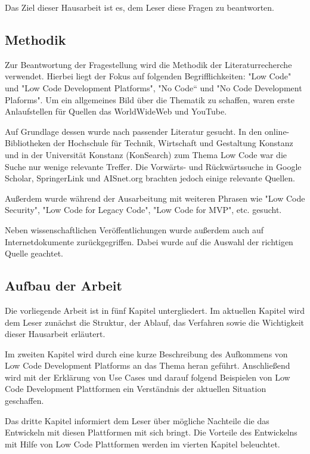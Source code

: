 \documentclass[12pt]{article} %
\begin{document}
	Das Ziel dieser Hausarbeit ist es, dem Leser diese Fragen zu beantworten. 
	
	\subsection{Methodik}
	Zur Beantwortung der Fragestellung wird die Methodik der Literaturrecherche verwendet. Hierbei liegt der Fokus auf folgenden Begrifflichkeiten:
	"Low Code" und "Low Code Development Platforms", "No Code“ und "No Code Development Plaforms". 
	Um ein allgemeines Bild über die Thematik zu schaffen, waren erste Anlaufstellen für Quellen das WorldWideWeb und YouTube. \newline
	
	Auf Grundlage dessen wurde nach passender Literatur gesucht. In den online-Bibliotheken der Hochschule für Technik, Wirtschaft und Gestaltung Konstanz und in der Universität Konstanz (KonSearch) zum Thema Low Code war die Suche nur wenige relevante Treffer. Die Vorwärts- und Rückwärtssuche in Google Scholar, SpringerLink und AISnet.org brachten jedoch einige relevante Quellen. 
	
	Außerdem wurde während der Ausarbeitung mit weiteren Phrasen wie "Low Code Security", "Low Code for Legacy Code", "Low Code for MVP", etc. gesucht. \newline 
	 
	Neben wissenschaftlichen Veröffentlichungen wurde außerdem auch auf Internetdokumente zurückgegriffen. Dabei wurde auf die Auswahl der richtigen Quelle geachtet.
	
	\subsection{Aufbau der Arbeit}
	Die vorliegende Arbeit ist in fünf Kapitel untergliedert. Im aktuellen Kapitel wird dem Leser zunächst die Struktur, der Ablauf, das Verfahren sowie die Wichtigkeit dieser Hausarbeit erläutert. \newline
	
	Im zweiten Kapitel wird durch eine kurze Beschreibung des Aufkommens von Low Code Development Platforms an das Thema heran geführt. Anschließend wird mit der Erklärung von Use Cases und darauf folgend Beispielen von Low Code Development Plattformen ein Verständnis der aktuellen Situation geschaffen. \newline
	
	Das dritte Kapitel informiert dem Leser über mögliche Nachteile die das Entwickeln mit diesen Plattformen mit sich bringt. 
	Die Vorteile des Entwickelns mit Hilfe von Low Code Plattformen werden im vierten Kapitel beleuchtet. \newline
	
\end{document}
